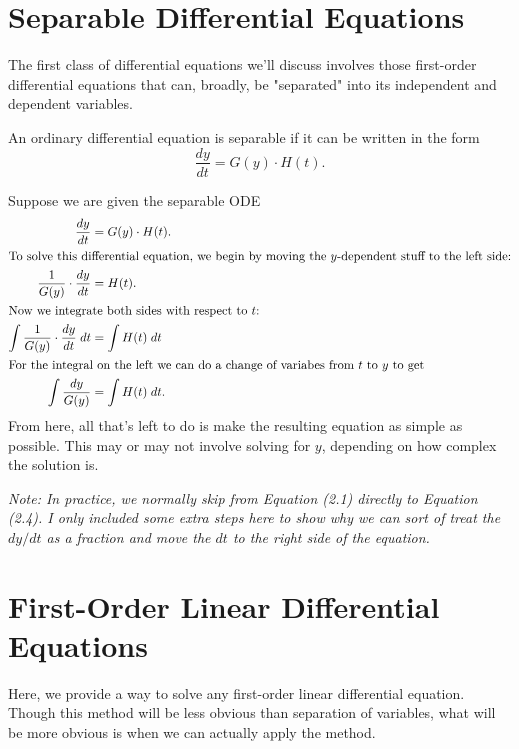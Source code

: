 \documentclass[../m82main.tex]{subfiles}
\begin{document}
\section{Separable Differential Equations}
The first class of differential equations we'll discuss involves those first-order differential equations that can, broadly, be "separated" into its independent and dependent variables.

\begin{definition}
    An ordinary differential equation is separable if it can be written in the form
    \[ \frac{dy}{dt} = G(y) \cdot H(t). \]
\end{definition}

\begin{example}
    Suppose we are given the separable ODE
    \begin{align}
        \frac{dy}{dt} &= G(y) \cdot H(t). \\
        \intertext{To solve this differential equation, we begin by moving the $y$-dependent stuff to the left side:}
        \frac{1}{G(y)} \cdot \frac{dy}{dt} &= H(t). \\
        \intertext{Now we integrate both sides with respect to $t$:}
        \int \frac{1}{G(y)} \cdot \frac{dy}{dt} \;dt &= \int H(t) \;dt \\
        \intertext{For the integral on the left we can do a change of variabes from $t$ to $y$ to get}
        \int \frac{dy}{G(y)} &= \int H(t) \;dt.
    \end{align}
    From here, all that's left to do is make the resulting equation as simple as possible.
    This may or may not involve solving for $y$, depending on how complex the solution is.

    \medskip
    \textit{Note: In practice, we normally skip from Equation (2.1) directly to Equation (2.4).
    I only included some extra steps here to show why we can sort of treat the $dy/dt$ as a fraction and move the $dt$ to the right side of the equation.}
\end{example}

\section{First-Order Linear Differential Equations}
Here, we provide a way to solve any first-order linear differential equation.
Though this method will be less obvious than separation of variables, what will be more obvious is when we can actually apply the method.
\end{document}
